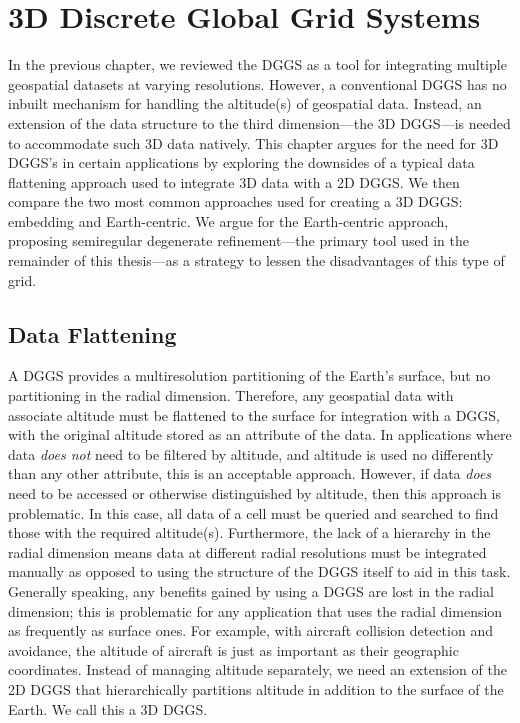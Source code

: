 \chapter{3D Discrete Global Grid Systems} \label{chap:3ddggs}
In the previous chapter, we reviewed the DGGS as a tool for integrating multiple geospatial datasets at varying resolutions.
However, a conventional DGGS has no inbuilt mechanism for handling the altitude(s) of geospatial data.
Instead, an extension of the data structure to the third dimension---the 3D DGGS---is needed to accommodate such 3D data natively.
This chapter argues for the need for 3D DGGS's in certain applications by exploring the downsides of a typical data flattening approach used to integrate 3D data with a 2D DGGS.
We then compare the two most common approaches used for creating a 3D DGGS: embedding and Earth-centric.
We argue for the Earth-centric approach, proposing semiregular degenerate refinement---the primary tool used in the remainder of this thesis---as a strategy to lessen the disadvantages of this type of grid.


\section{Data Flattening} \label{chap:3:flatten}
A DGGS provides a multiresolution partitioning of the Earth's surface, but no partitioning in the radial dimension.
Therefore, any geospatial data with associate altitude must be flattened to the surface for integration with a DGGS, with the original altitude stored as an attribute of the data.
In applications where data \textit{does not} need to be filtered by altitude, and altitude is used no differently than any other attribute, this is an acceptable approach.
However, if data \textit{does} need to be accessed or otherwise distinguished by altitude, then this approach is problematic.
In this case, all data of a cell must be queried and searched to find those with the required altitude(s).
Furthermore, the lack of a hierarchy in the radial dimension means data at different radial resolutions must be integrated manually as opposed to using the structure of the DGGS itself to aid in this task.
Generally speaking, any benefits gained by using a DGGS are lost in the radial dimension; this is problematic for any application that uses the radial dimension as frequently as surface ones.
For example, with aircraft collision detection and avoidance, the altitude of aircraft is just as important as their geographic coordinates.
Instead of managing altitude separately, we need an extension of the 2D DGGS that hierarchically partitions altitude in addition to the surface of the Earth.
We call this a 3D DGGS.


